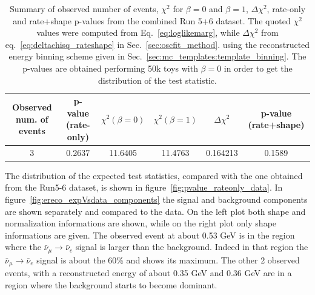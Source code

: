%
%
\begin{table}[htb]
\centering
\begin{tabular}{| c | c | c | c | c | c |}
\hline
Observed num. of events 		& p-value (rate-only)	 	& $\chi^2 (\beta=0)$ 		& $\chi^2 (\beta=1)$	 	& $\Delta \chi^2$ 	& p-value (rate+shape)  	\\
\hline
3				 		& 0.2637 		 		& 11.6405				& 11.4763				& 0.164213		 	& 0.1589			  	\\
\hline
\end{tabular}
\caption{
Summary of observed number of events, $\chi^2$ for $\beta=0$ and $\beta=1$, $\Delta \chi^2$, rate-only and rate+shape p-values from the combined Run 5+6 dataset.
The quoted $\chi^2$ values were computed from Eq.~\ref{eq:loglikemarg},
while $\Delta \chi^2$ from eq.~\ref{eq:deltachisq_rateshape} in Sec.~\ref{sec:oscfit_method}.
using the reconstructed energy binning scheme given in Sec.~\ref{sec:mc_templates:template_binning}.
The p-values are obtained performing 50k toys with $\beta=0$ in order to get the distribution of the test statistic.
}
\label{tab:results}
\end{table}


%
%

The distribution of the expected test statistics, compared with the one obtained from the Run5-6 dataset, is shown in figure~\ref{fig:pvalue_rateonly_data}.
In figure~\ref{fig:ereco_expVsdata_components} the signal and background components are shown 
separately and compared to the data. On the left plot both shape and normalization informations are shown,
while on the right plot only shape informations are given.
The observed event at about 0.53 GeV is in the region where the $\bar{\nu}_{\mu} \to \bar{\nu}_e$ signal is larger than the background.
Indeed in that region the $\bar{\nu}_{\mu} \to \bar{\nu}_e$ signal is about the 60\% and shows its maximum.
The other 2 observed events, with a reconstructed energy of about 0.35 GeV and 0.36 GeV are in a region where
the background starts to become dominant.

